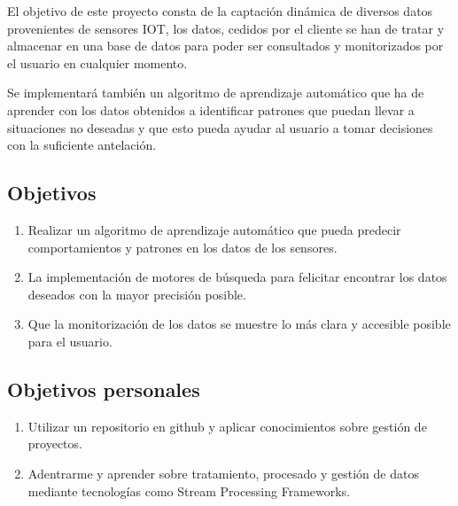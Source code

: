
El objetivo de este proyecto consta de la captación dinámica de diversos datos provenientes de sensores IOT, los datos, cedidos por el cliente se han de tratar y almacenar en una base de datos para poder ser consultados y monitorizados por el usuario en cualquier momento. 

Se implementará también un algoritmo de aprendizaje automático que ha de aprender con los datos obtenidos a identificar patrones que puedan llevar a situaciones no deseadas y que esto pueda ayudar al usuario a tomar decisiones con la suficiente antelación.

\subsection{Objetivos}

\begin{enumerate}
    \item Realizar un algoritmo de aprendizaje automático que pueda predecir comportamientos y patrones en los datos de los sensores.
    \item La implementación de motores de búsqueda para felicitar encontrar los datos deseados con la mayor precisión posible.
    \item Que la monitorización de los datos se muestre lo más clara y accesible posible para el usuario.
\end{enumerate}


\subsection{Objetivos personales}

\begin{enumerate}
    \item Utilizar un repositorio en github y aplicar conocimientos sobre gestión de proyectos.
    \item Adentrarme y aprender sobre tratamiento, procesado y gestión de datos mediante tecnologías como Stream Processing Frameworks.
\end{enumerate}
